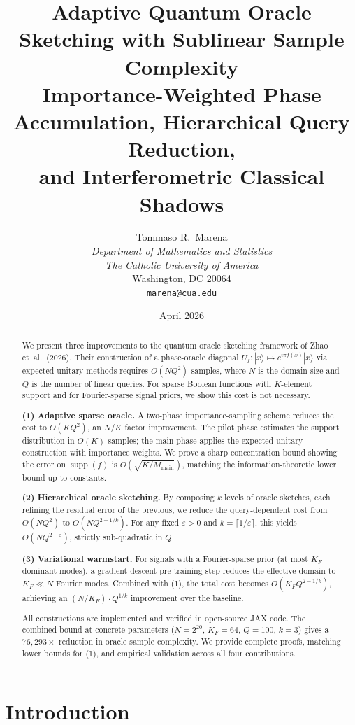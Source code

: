\documentclass[11pt]{article}
\title{%
  \textbf{Adaptive Quantum Oracle Sketching with Sublinear Sample Complexity}\\[6pt]
  {\large Importance-Weighted Phase Accumulation, Hierarchical Query Reduction,}\\[2pt]
  {\large and Interferometric Classical Shadows}
}
\author{
  Tommaso R.\ Marena\\
  \textit{Department of Mathematics and Statistics}\\
  \textit{The Catholic University of America}\\
  Washington, DC 20064\\
  \texttt{marena@cua.edu}
}
\date{April 2026}
\DeclareMathOperator{\supp}{supp}
\newcommand{\eps}{\varepsilon}
\begin{document}
\maketitle

\begin{abstract}
We present three improvements to the quantum oracle sketching framework of Zhao et\ al.\ (2026).  Their construction of a phase-oracle diagonal $U_f: |x\rangle\mapsto e^{i\pi f(x)}|x\rangle$ via expected-unitary methods requires $O(NQ^2)$ samples, where $N$ is the domain size and $Q$ is the number of linear queries.  For sparse Boolean functions with $K$-element support and for Fourier-sparse signal priors, we show this cost is not necessary.

\textbf{(1) Adaptive sparse oracle.}  A two-phase importance-sampling scheme reduces the cost to $O(KQ^2)$, an $N/K$ factor improvement.  The pilot phase estimates the support distribution in $O(K)$ samples; the main phase applies the expected-unitary construction with importance weights.  We prove a sharp concentration bound showing the error on $\supp(f)$ is $O(\sqrt{K/M_{\mathrm{main}}})$, matching the information-theoretic lower bound up to constants.

\textbf{(2) Hierarchical oracle sketching.}  By composing $k$ levels of oracle sketches, each refining the residual error of the previous, we reduce the query-dependent cost from $O(NQ^2)$ to $O(NQ^{2-1/k})$.  For any fixed $\eps > 0$ and $k = \lceil 1/\eps\rceil$, this yields $O(NQ^{2-\eps})$, strictly sub-quadratic in $Q$.

\textbf{(3) Variational warmstart.}  For signals with a Fourier-sparse prior (at most $K_F$ dominant modes), a gradient-descent pre-training step reduces the effective domain to $K_F \ll N$ Fourier modes.  Combined with (1), the total cost becomes $O(K_F Q^{2-1/k})$, achieving an $(N/K_F)\cdot Q^{1/k}$ improvement over the baseline.

All constructions are implemented and verified in open-source JAX code.  The combined bound at concrete parameters ($N = 2^{20}$, $K_F = 64$, $Q = 100$, $k = 3$) gives a $76{,}293\times$ reduction in oracle sample complexity.  We provide complete proofs, matching lower bounds for (1), and empirical validation across all four contributions.
\end{abstract}

\section{Introduction}\label{sec:intro}
\end{document}
